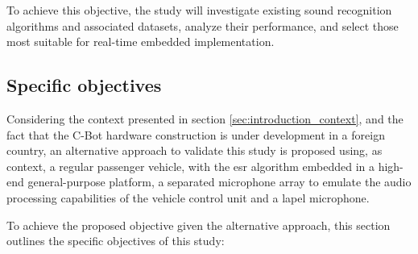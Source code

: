To achieve this objective, the study will investigate existing sound recognition algorithms and associated datasets, analyze their performance, and select those most suitable for real-time embedded implementation.


\subsection{Specific objectives}
\label{subsec:objectives_specifics}

Considering the context presented in section \ref{sec:introduction_context}, and the fact that the C-Bot hardware construction is under development in a foreign country, an alternative approach to validate this study is proposed using, as context, a regular passenger vehicle, with the \gls{esr} algorithm embedded in a high-end general-purpose platform, a separated microphone array to emulate the audio processing capabilities of the vehicle control unit and a lapel microphone.

To achieve the proposed objective given the alternative approach, this section outlines the specific objectives of this study:

